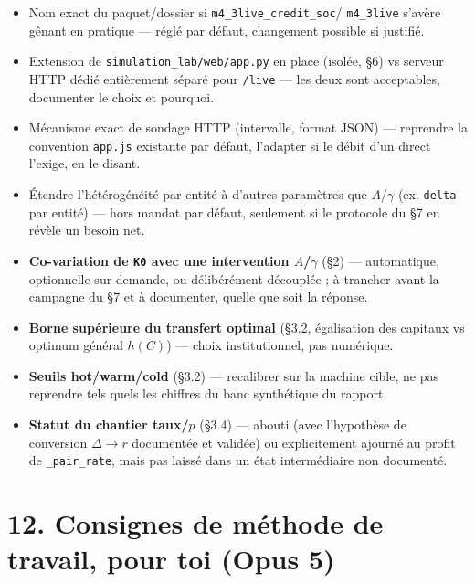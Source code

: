\documentclass[11pt,a4paper]{article}
\newcommand{\code}[1]{\texttt{#1}}
\begin{document}
\begin{itemize}
\item Nom exact du paquet/dossier si \code{m4\_3live\_credit\_soc}/
  \code{m4\_3live} s'avère gênant en pratique --- réglé par défaut,
  changement possible si justifié.
\item Extension de \code{simulation\_lab/web/app.py} en place (isolée,
  \S6) vs serveur HTTP dédié entièrement séparé pour \code{/live} --- les
  deux sont acceptables, documenter le choix et pourquoi.
\item Mécanisme exact de sondage HTTP (intervalle, format JSON) ---
  reprendre la convention \code{app.js} existante par défaut, l'adapter
  si le débit d'un direct l'exige, en le disant.
\item Étendre l'hétérogénéité par entité à d'autres paramètres que
  $A$/$\gamma$ (ex. \code{delta} par entité) --- hors mandat par défaut,
  seulement si le protocole du \S7 en révèle un besoin net.
\item \textbf{Co-variation de \code{K0} avec une intervention
  $A$/$\gamma$} (\S2) --- automatique, optionnelle sur demande, ou
  délibérément découplée ; à trancher avant la campagne du \S7 et à
  documenter, quelle que soit la réponse.
\item \textbf{Borne supérieure du transfert optimal} (\S3.2, égalisation
  des capitaux vs optimum général $h(C)$) --- choix institutionnel, pas
  numérique.
\item \textbf{Seuils hot/warm/cold} (\S3.2) --- recalibrer sur la
  machine cible, ne pas reprendre tels quels les chiffres du banc
  synthétique du rapport.
\item \textbf{Statut du chantier taux/$p$} (\S3.4) --- abouti (avec
  l'hypothèse de conversion $\Delta\to r$ documentée et validée) ou
  explicitement ajourné au profit de \code{\_pair\_rate}, mais pas
  laissé dans un état intermédiaire non documenté.
\end{itemize}

\section*{12. Consignes de méthode de travail, pour toi (Opus 5)}
\end{document}
